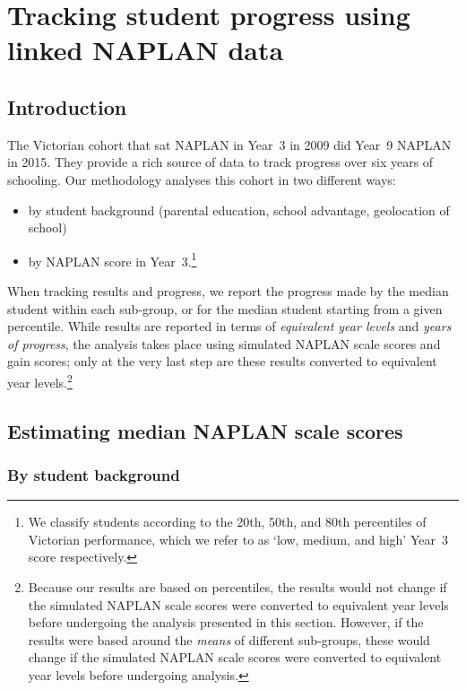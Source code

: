 \chapter{Tracking student progress using linked NAPLAN data} \label{chap4}

\section{Introduction}

The Victorian cohort that sat NAPLAN in \mbox{Year 3} in 2009 did \mbox{Year 9} NAPLAN in 2015. They provide a rich source of data to track progress over six years of schooling. Our methodology analyses this cohort in two different ways:
\begin{itemize}
\item by student background (parental education, school advantage, geolocation of school)
\item by NAPLAN score in \mbox{Year 3}.\footnote{We classify students according to the 20th, 50th, and 80th percentiles of Victorian performance, which we refer to as `low, medium, and high' \mbox{Year 3} score respectively.}
\end{itemize}
When tracking results and progress, we report the progress made by the median student within each sub-group, or for the median student starting from a given percentile. While results are reported in terms of \textit{equivalent year levels} and \textit{years of progress}, the analysis takes place using simulated NAPLAN scale scores and gain scores; only at the very last step are these results converted to equivalent year levels.\footnote{Because our results are based on percentiles, the results would not change if the simulated NAPLAN scale scores were converted to equivalent year levels before undergoing the analysis presented in this section. However, if the results were based around the \textit{means} of different sub-groups, these would change if the simulated NAPLAN scale scores were converted to equivalent year levels before undergoing analysis.}   

\section{Estimating median NAPLAN scale scores}

\subsection{By student background} \label{sec:ses_sub}

